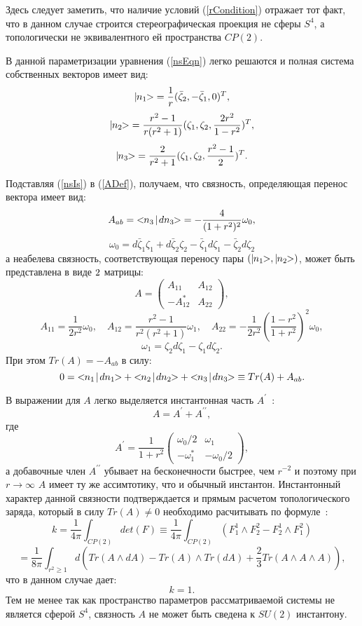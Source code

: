 \documentclass[a4paper]{article}
\def\MAP#1{\ifmmode{#1}\else{$#1$}\fi}
\def\ket#1{\MAP{\mid\!\!#1\!\!>}}
\def\dirProd#1#2{\MAP{<\!\! #1 \! \mid \! #2 \!\!>}}
\def\be{\begin{equation} \nonumber}
\def\ee{\end{equation}}
\def\bel#1{\begin{equation}\label{#1}}
\def\rf#1{(\ref{#1})}
\def\H{\MAP{\hat H}}
\begin{document}
Здесь следует заметить, что наличие условий \rf{rCondition} отражает тот факт,
что в данном случае строится стереографическая проекция не сферы $S^4$,
а топологически не эквивалентного ей пространства $CP(2)$.

В данной параметризации уравнения \rf{nsEqn} легко решаются
и полная система собственных векторов \H имеет вид:
\bel{nsIs}
\ket{n_1} = \frac{1}{r}(\bar \zeta_2, - \bar \zeta_1, 0)^T,
\ee
\be
\ket{n_2} = \frac{r^2 - 1}{r(r^2 +1)}(\zeta_1, \zeta_2, \frac{2r^2}{1 - r^2})^T,
\ee
\be
\ket{n_3} = \frac{2}{r^2 +1}(\zeta_1, \zeta_2, \frac{r^2 - 1}{2})^T.
\ee


Подставляя \rf{nsIs} в \rf{ADef}, получаем, что связность,
определяющая перенос вектора \ket{n_3} имеет вид:
\be
A_{ab} = \dirProd{n_3}{dn_3} = -\frac{4}{(1 + r^2)^2}\omega_0,
\ee
\be
\omega_0 = d\bar\zeta_1 \zeta_1 + d\bar\zeta_2 \zeta_2
- \bar\zeta_1 d\zeta_1 - \bar\zeta_2 d\zeta_2
\ee
а неабелева связность, соответствующая переносу пары
$(\ket{n_1}, \ket{n_2})$, может быть представлена в виде $2 \time 2$
матрицы:
\be
 A = \left( \begin{array}{cc}
 A_{11} & A_{12} \\
 -A_{12}^* & A_{22} \end{array} \right),
\ee
\bel{AIs}
A_{11} = \frac{1}{2r^2}\omega_0, \quad
A_{12} = \frac{r^2 - 1}{r^2(r^2 + 1)}\omega_1, \quad
A_{22} = - \frac{1}{2r^2}
\left( \frac{1 - r^2}{1 + r^2} \right)^2\omega_0,
\ee
\be
\omega_1 = \zeta_2 d\zeta_1 - \zeta_1 d\zeta_2.
\ee
 При этом $Tr(A) = -A_{ab}$ в силу:
\be
0 = \dirProd{n_1}{dn_1} + \dirProd{n_2}{dn_2} + \dirProd{n_3}{dn_3} \equiv
Tr(A) + A_{ab}.
\ee

В выражении для $A$ легко выделяется инстантонная часть
$A^\prime$~\cite{InstantonExpression}:
\be
A = A^\prime + A^{\prime\!\prime},
\ee
где
\be
A^\prime = \frac{1}{1 + r^2}\left(\begin{array}{cc}
 \omega_0/2 & \omega_1 \\
 -\omega_1^* & -\omega_0/2 \end{array} \right),
\ee
а добавочные член $A^{\prime\!\prime}$
убывает на бесконечности быстрее, чем $r^{-2}$ и поэтому при
$r \rightarrow \infty$ $A$ имеет ту же ассимтотику,
что и обычный инстантон. Инстантонный характер данной связности
подтверждается и прямым расчетом топологического заряда, который
в силу $Tr(A) \ne 0$ необходимо расчитывать по
формуле~\cite{Postnikov}:
\be
k = \frac{1}{4\pi} \int_{CP(2)} det(F) \equiv
\frac{1}{4\pi} \int_{CP(2)} (F^1_1 \wedge F^2_2 - F^1_2 \wedge F^2_1)
\ee
\be
= \frac{1}{8\pi} \int_{r^2 \ge 1} d\left(
Tr(A \wedge dA) - Tr(A) \wedge Tr(dA) + \frac{2}{3} Tr(A \wedge A \wedge A)
\right),
\ee
что в данном случае дает:
\be
k = 1.
\ee
 Тем не менее так как пространство параметров рассматриваемой системы
не является сферой $S^4$, связность $A$ не может быть сведена к
$SU(2)$ инстантону.
\end{document}
